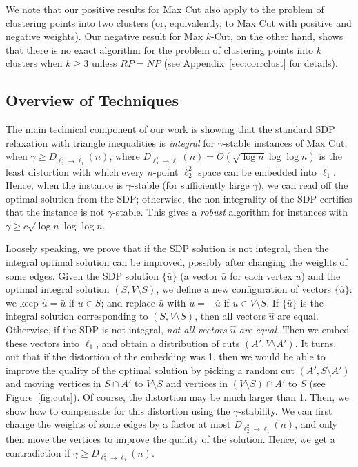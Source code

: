 \documentclass[twoside,leqno,twocolumn]{article}
\begin{document}
We note that our positive results for Max Cut also apply to the problem of clustering points into two clusters (or, equivalently, to Max Cut
with positive and negative weights). Our negative result for Max $k$-Cut, on the other hand, shows that there is no exact algorithm for
the problem of clustering points into $k$ clusters when $k\geq 3$ unless $RP=NP$ (see Appendix~\ref{sec:corrclust} for details). 

\subsection{Overview of Techniques}

The main technical component of our work is showing that the standard SDP relaxation with triangle inequalities
is {\em integral} for $\gamma$-stable instances of Max Cut, when $\gamma\geq D_{\ell_2^2\to \ell_1}(n)$, where
$D_{\ell_2^2\to \ell_1}(n) = O(\sqrt{\log n} \log\log n)$ is the least distortion with which every $n$-point $\ell_2^2$ space can be embedded into $\ell_1$.
Hence, when the instance is $\gamma$-stable (for sufficiently large $\gamma$), we can read off the optimal solution from the SDP; otherwise, the non-integrality of the SDP certifies that the instance is not $\gamma$-stable. This gives a {\em robust} algorithm for instances with $\gamma \geq c
\sqrt{\log n}\log \log n$.

Loosely speaking, we prove that if the SDP solution is not integral, then the integral optimal solution can be improved,
possibly after changing the weights of some \ifSODA\linebreak \newpage\noindent\fi edges.
Given the SDP solution $\{\bar{u}\}$ (a vector $\bar{u}$ for each vertex $u$) and the optimal integral solution $(S, V\setminus S)$,
we define a new configuration of vectors $\{\hat{u}\}$: we keep $\hat{u} = \bar{u}$ if $u\in S$; and replace $\bar{u}$
with $\hat{u} = -\bar{u}$ if $u\in V\setminus S$. If $\{\bar{u}\}$ is the integral solution corresponding to $(S, V\setminus S)$,
then all vectors $\hat{u}$ are equal. Otherwise, if the SDP is not integral, \textit{not all vectors $\hat{u}$ are equal}. Then we embed 
these vectors into $\ell_1$, and obtain a distribution
of cuts $(A', V\setminus A')$. It turns, out that if the distortion of the embedding was 1, then we would be able to 
improve the quality of the optimal solution by picking a random cut $(A', S\setminus A')$ and moving vertices in $S\cap A'$ to $V\setminus S$ and vertices in $(V\setminus S)\cap A'$ to $S$
(see Figure~\ref{fig:cuts}). Of course, the distortion may be much larger than 1. Then, we show how to compensate
for this distortion using the $\gamma$-stability.
We can first change the weights of some edges by a factor at most $D_{\ell_2^2\to \ell_1}(n)$, and only then 
move the vertices to improve the quality of the solution. Hence, we get a contradiction if $\gamma \geq D_{\ell_2^2\to \ell_1}(n)$.
\end{document}
